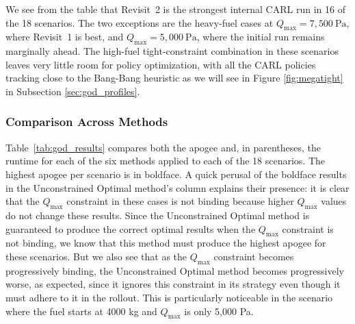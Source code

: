 \documentclass[mnsc,sglanonrev]{informs4}
\begin{document}
We see from the table that Revisit~2 is the strongest internal CARL run in 16 of the 18 scenarios. The two exceptions are the heavy-fuel cases at $Q_{\max}=7{,}500\ \mathrm{Pa}$, where Revisit~1 is best, and $Q_{\max}=5{,}000\ \mathrm{Pa}$, where the initial run remains marginally ahead. The high-fuel tight-constraint combination in these scenarios leaves very little room for policy optimization, with all the CARL policies tracking close to the Bang-Bang heuristic as we will see in Figure \ref{fig:megatight} in Subsection \ref{sec:god_profiles}.

\subsubsection{Comparison Across Methods}
\label{sec:god_combined}

Table~\ref{tab:god_results} compares both the apogee and, in parentheses, the runtime for each of the six methods applied to each of the 18 scenarios. The highest apogee per scenario is in boldface. A quick perusal of the boldface results in the Unconstrained Optimal method's column explains their presence: it is clear that the $Q_{\max}$ constraint in these cases is not binding because higher $Q_{\max}$ values do not change these results. Since the Unconstrained Optimal method is guaranteed to produce the correct optimal results when the $Q_{\max}$ constraint is not binding, we know that this method must produce the highest apogee for these scenarios. But we also see that as the $Q_{\max}$ constraint becomes progressively binding, the Unconstrained Optimal method becomes progressively worse, as expected, since it ignores this constraint in its strategy even though it must adhere to it in the rollout. This is particularly noticeable in the scenario where the fuel starts at 4000 kg and $Q_{\max}$ is only 5,000 Pa. 
\end{document}

